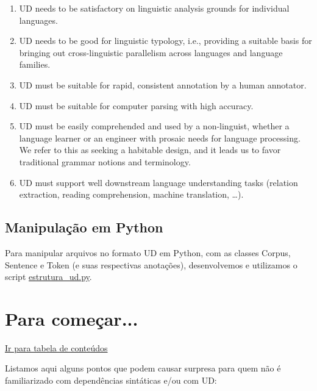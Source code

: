 \documentclass[output=paper,colorlinks,citecolor=brown]{langscibook}
\begin{document}
	\begin{enumerate}
		\item UD needs to be satisfactory on linguistic analysis grounds for individual languages.
		\item UD needs to be good for linguistic typology, i.e., providing a suitable basis for bringing out cross-linguistic parallelism across languages and language families.
		\item UD must be suitable for rapid, consistent annotation by a human annotator.
		\item UD must be suitable for computer parsing with high accuracy.
		\item UD must be easily comprehended and used by a non-linguist, whether a language learner or an engineer with prosaic needs for language processing. We refer to this as seeking a habitable design, and it leads us to favor traditional grammar notions and terminology.
		\item UD must support well downstream language understanding tasks (relation extraction, reading comprehension, machine translation, …).
	\end{enumerate}


\section{Manipulação em Python}\label{sec:python}

	Para manipular arquivos no formato UD em Python, com as classes Corpus, Sentence e Token (e suas respectivas anotações), desenvolvemos e utilizamos o script \href{https://github.com/alvelvis/ACDC-UD#estrutura_udpy}{estrutura\_ud.py}.

\chapter{Para começar...}\label{sec:paracomecar}

	\hyperlink{toc}{Ir para tabela de conteúdos\\}

	Listamos aqui alguns pontos que podem causar surpresa para quem não é familiarizado com dependências sintáticas e/ou com UD:
	
\end{document}
